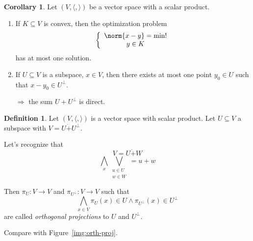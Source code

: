 \documentclass[a4paper,landscape,twocolumn]{article}
\theoremstyle{definition}
\newtheorem{defi}{Definition}
\newtheorem{cor}{Corollary}
\DeclarePairedDelimiter\norm\lVert\rVert
\begin{document}
\begin{cor}
  Let $(V, \langle, \rangle)$ be a vector space with a scalar product.
  \begin{enumerate}
    \item If $K \subseteq V$ is convex, then the optimization problem
      \[
        \left\{
          \begin{array}{c}
            \norm{x - y} = \text{min!} \\
            y \in K
          \end{array}
        \right.
      \]
      has at most one solution.
    \item If $U \subseteq V$ is a subspace, $x \in V$, then there exists at most
      one point $y_0 \in U$ such that $x - y_0 \in U^\bot$.

      $\Rightarrow$ the sum $U + U^\bot$ is direct.
  \end{enumerate}
\end{cor}

\begin{defi}
  Let $(V, \langle, \rangle)$ is a vector space with scalar product.
  Let $U \subseteq V$ a subspace with $V = U \dot{+} U^\bot$.

  Let's recognize that
  \[ V = U \dot{+} W \]
  \[ \bigwedge_{x} \bigvee_{\substack{u \in U \\ w \in W}} = u + w \]

  Then $\pi_U: V \to V$ and $\pi_{U^\bot}: V \to V$ such that
  \[ \bigwedge_{x \in V} \pi_U(x) \in U \land \pi_{U^\bot}(x) \in U^\bot \]
  are called \emph{orthogonal projections} to $U$ and $U^\bot$.

  Compare with Figure~\ref{img:orth-proj}.
\end{defi}
\end{document}
